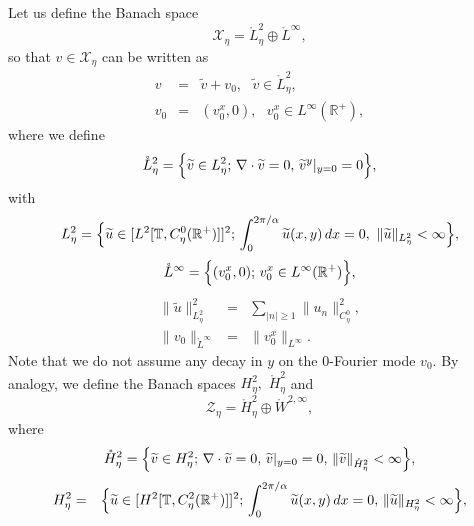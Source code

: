 \documentclass[11pt]{article}
\begin{document}
Let us define the Banach space
\begin{equation*}
\mathcal{X}_{\eta}=\mathring{L}_{\eta}^{2}\oplus \mathring{L}^{\infty },
\end{equation*}%
so that $v\in \mathcal{X}_{\eta}$ can be written as%
\begin{eqnarray*}
v &=&\widetilde{v}+v_{0},\text{ }\widetilde{v}\in \mathring{L}_{\eta}^{2}, \\
v_{0} &=&(v_{0}^{x},0),\text{ }v_{0}^{x}\in L^{\infty }(\mathbb{R}^{+}),
\end{eqnarray*}%
where we define%
\begin{equation*}
\mathring{L}_{\eta}^{2}=\Bigl\{ \widetilde{v}\in L_\eta^{2}; 
\, \nabla \cdot \widetilde{v}=0, \, \widetilde{v}^{y}|_{y=0}=0 \Bigr\} ,
\end{equation*}%
with%
\begin{equation*}
L_{\eta}^{2}=\Bigl\{ \widetilde{u}\in [L^{2}[\mathbb{T},C_{\eta}^{0}(\mathbb{R}^{+})]]^{2};
\, \int_{0}^{2\pi/\alpha }\widetilde{u}(x,y) \, dx=0,\text{ }\|\widetilde{u}\|_{L_{\eta}^{2}}<\infty \Bigr\},
\end{equation*}%
\begin{equation*}
\mathring{L}^{\infty } = \Bigl\{ (v_{0}^{x},0); \, v_{0}^{x}\in L^{\infty }(\mathbb{R}^{+})\Bigr\},
\end{equation*}%
\begin{eqnarray*}
\|\widetilde{u}\|_{L_{\eta}^{2}}^{2} &=&\sum_{|n|\geq
1}\|u_{n}\|_{C_{\eta}^{0}}^{2},\\
\|v_{0}\|_{\mathring{L}^{\infty }} &=&\|v_{0}^{x}\|_{L^{\infty }}.
\end{eqnarray*}%
Note that we do not assume any decay in $y$ on the 0-Fourier mode $v_0$.
By analogy, we define the Banach spaces $H_{\eta}^{2},$ $\mathring{H}_{\eta}^{2}$ and
\begin{equation*}
\mathcal{Z}_{\eta}=\mathring{H}_{\eta}^{2}\oplus \mathring{W}^{2,\infty },
\end{equation*}%
where%
\begin{equation*}
\mathring{H}_{\eta}^{2}= \Bigl\{\widetilde{v}\in H_{\eta}^{2}; \, \nabla \cdot \widetilde{v}%
=0, \, \widetilde{v}|_{y=0}=0, \, \|\widetilde{v}\|_{\mathring{H}_{\eta}^{2}}<\infty \Bigr\},
\end{equation*}%
\begin{eqnarray*}
H_{\eta}^{2} &=&\Bigl\{ \widetilde{u}\in \lbrack H^{2}[\mathbb{T},C_{\eta}^{2}(\mathbb{R}^{+})]]^{2}; \,
 \int_{0}^{2\pi/\alpha }\widetilde{u}(x,y) \, dx=0, \, \|\widetilde{u}%
\|_{H_{\eta}^{2}}<\infty \Bigl\} ,
\end{eqnarray*}%
\end{document}
